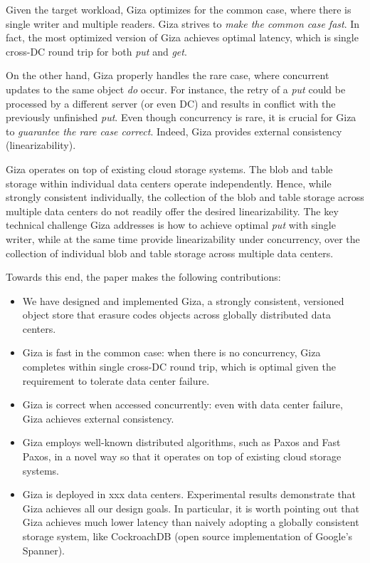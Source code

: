 Given the target workload, Giza optimizes for the common case, where there is
single writer and multiple readers. Giza strives to {\em make the common case
  fast}. In fact, the most optimized version of Giza achieves optimal latency,
which is single cross-DC round trip for both {\em put} and {\em get}.

On the other hand, Giza properly handles the rare case,
where concurrent updates to the same object {\em do} occur.
For instance,
the retry of a {\em put} could be processed by a different server (or even DC)
and results in conflict with the previously unfinished {\em put}.
Even though concurrency is rare,
it is crucial for Giza to {\em guarantee the rare case correct}.
Indeed, Giza provides external consistency (linearizability).

Giza operates on top of existing cloud storage systems. 
The blob and table storage within individual data centers operate independently.
Hence, while strongly consistent individually, the collection of the blob and
table storage across multiple data centers do not readily offer the desired
linearizability. The key technical challenge Giza addresses is how to achieve
optimal {\em put} with single writer, while at the same time provide
linearizability under concurrency, over the collection of individual blob and
table storage across multiple data centers.

Towards this end, the paper makes the following contributions:
\begin{itemize}
    \item We have designed and implemented Giza, a strongly consistent,
      versioned object store that erasure codes objects across globally
      distributed data centers.
    \item Giza is fast in the common case: when there is no concurrency, Giza
      completes within single cross-DC round trip, which is optimal given the
      requirement to tolerate data center failure.
    \item Giza is correct when accessed concurrently: even with data center
      failure, Giza achieves external consistency.
    \item Giza employs well-known distributed algorithms, such as Paxos and Fast
      Paxos, in a novel way so that it operates on top of existing cloud storage
      systems.
    \item Giza is deployed in xxx data centers. Experimental results demonstrate
      that Giza achieves all our design goals. In particular, it is worth
      pointing out that Giza achieves much lower latency than naively adopting a
      globally consistent storage system, like CockroachDB (open source
      implementation of Google's Spanner).
\end{itemize}

